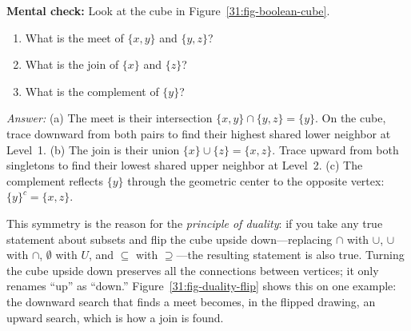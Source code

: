 \begin{recoverybox}
\textbf{Mental check:} Look at the cube in Figure~\ref{31:fig-boolean-cube}.
\begin{enumerate}[label=(\alph*)]
  \item What is the meet of $\{x, y\}$ and $\{y, z\}$?
  \item What is the join of $\{x\}$ and $\{z\}$?
  \item What is the complement of $\{y\}$?
\end{enumerate}
\emph{Answer:} (a) The meet is their intersection $\{x, y\} \cap \{y, z\} = \{y\}$. On the cube, trace downward from both pairs to find their highest shared lower neighbor at Level~1. (b) The join is their union $\{x\} \cup \{z\} = \{x, z\}$. Trace upward from both singletons to find their lowest shared upper neighbor at Level~2. (c) The complement reflects $\{y\}$ through the geometric center to the opposite vertex: $\{y\}^c = \{x, z\}$.
\end{recoverybox}

This symmetry is the reason for the \emph{principle of duality}: if you take any true statement about subsets and flip the cube upside down---replacing $\cap$ with $\cup$, $\cup$ with $\cap$, $\emptyset$ with $U$, and $\subseteq$ with $\supseteq$---the resulting statement is also true. Turning the cube upside down preserves all the connections between vertices; it only renames ``up'' as ``down.'' Figure~\ref{31:fig-duality-flip} shows this on one example: the downward search that finds a meet becomes, in the flipped drawing, an upward search, which is how a join is found.

